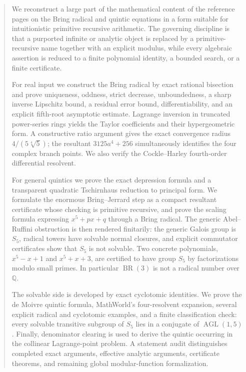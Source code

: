 \documentclass[11pt,oneside]{article}
\theoremstyle{definition}
\theoremstyle{remark}
\newcommand{\Q}{\mathbb Q}
\newcommand{\BR}{\operatorname{BR}}
\begin{document}
\begin{abstract}
We reconstruct a large part of the mathematical content of the reference pages
on the Bring radical and quintic equations in a form suitable for
intuitionistic primitive recursive arithmetic.  The governing discipline is
that a purported infinite or analytic object is replaced by a
primitive-recursive name together with an explicit modulus, while every
algebraic assertion is reduced to a finite polynomial identity, a bounded
search, or a finite certificate.

For real input we construct the Bring radical by exact rational bisection and
prove uniqueness, oddness, strict decrease, unboundedness, a sharp inverse
Lipschitz bound, a residual error bound, differentiability, and an explicit
fifth-root asymptotic estimate.  Lagrange inversion in truncated power-series
rings yields the Taylor coefficients and their hypergeometric form.  A
constructive ratio argument gives the exact convergence radius
\(4/(5\sqrt[4]{5})\); the resultant
\(3125a^4+256\) simultaneously identifies the four complex branch points.
We also verify the Cockle--Harley fourth-order differential resolvent.

For general quintics we prove the exact depression formula and a transparent
quadratic Tschirnhaus reduction to principal form.  We formulate the enormous
Bring--Jerrard step as a compact resultant certificate whose checking is
primitive recursive, and prove the scaling formula expressing
\(x^5+px+q\) through a Bring radical.  The generic Abel--Ruffini obstruction is
then rendered finitarily: the generic Galois group is \(S_5\), radical towers
have solvable normal closures, and explicit commutator certificates show that
\(S_5\) is not solvable.  Two concrete polynomials,
\(x^5-x+1\) and \(x^5+x+3\), are certified to have group \(S_5\) by
factorizations modulo small primes.  In particular \(\BR(3)\) is not a radical
number over \(\Q\).

The solvable side is developed by exact cyclotomic identities.  We prove the
de Moivre quintic formula, MathWorld's four-resolvent expansion, several
explicit radical and cyclotomic examples, and a finite classification check:
every solvable transitive subgroup of \(S_5\) lies in a conjugate of
\(\operatorname{AGL}(1,5)\).  Finally, denominator clearing is used to derive
the quintic occurring in the collinear Lagrange-point problem.  A statement
audit distinguishes completed exact arguments, effective analytic arguments,
certificate theorems, and remaining global modular-function formalization.
\end{abstract}

\tableofcontents
\clearpage
{}













\end{document}
